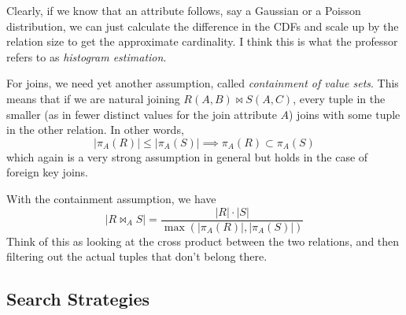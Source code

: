 \documentclass{article}
\begin{document}
    Clearly, if we know that an attribute follows, say a Gaussian or a Poisson distribution, we can just calculate the difference in the CDFs and scale up by the relation size to get the approximate cardinality. I think this is what the professor refers to as \textit{histogram estimation}. 

    For joins, we need yet another assumption, called \textit{containment of value sets}. This means that if we are natural joining $R(A, B) \bowtie S(A, C)$, every tuple in the smaller (as in fewer distinct values for the join attribute $A$) joins with some tuple in the other relation. In other words, 
    \begin{equation}
      |\pi_A (R)| \leq |\pi_A (S)| \implies \pi_A (R) \subset \pi_A (S)
    \end{equation}
    which again is a very strong assumption in general but holds in the case of foreign key joins. 

    \begin{example} 
      With the containment assumption, we have 
      \begin{equation}
        |R \bowtie_{A} S| = \frac{|R| \cdot |S|}{\max( |\pi_A (R)|, |\pi_A(S)|)}
      \end{equation} 
      Think of this as looking at the cross product between the two relations, and then filtering out the actual tuples that don't belong there.  
    \end{example}

  \subsection{Search Strategies} 
\end{document}
